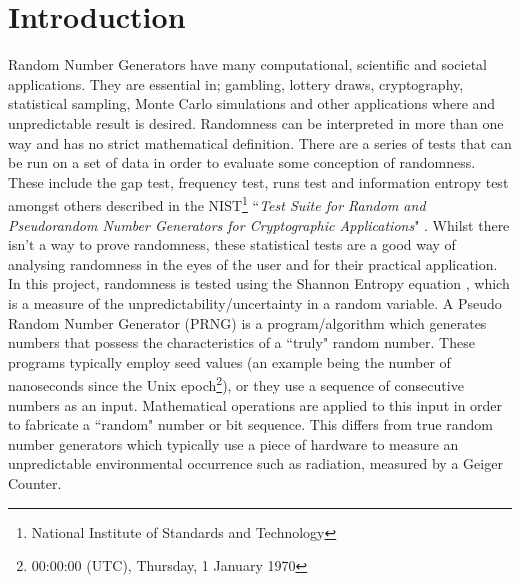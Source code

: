 \documentclass[a4paper,10.5pt]{article}
\begin{document}
\section{Introduction}
Random Number Generators have many computational, scientific and societal applications. They are essential in; gambling, lottery draws, cryptography, statistical sampling, Monte Carlo simulations and other applications where and unpredictable result is desired. Randomness can be interpreted in more than one way and has no strict mathematical definition. There are a series of tests that can be run on a set of data in order to evaluate some conception of randomness. These include the gap test, frequency test, runs test and information entropy test amongst others described in the NIST\footnote{National Institute of Standards and Technology} ``\emph{Test Suite for Random and Pseudorandom Number Generators for Cryptographic Applications}" \cite{nist}. Whilst there isn't a way to prove randomness, these statistical tests are a good way of analysing randomness in the eyes of the user and for their practical application. In this project, randomness is tested using the Shannon Entropy equation \cite[p.2]{kozarng}, which is a measure of the unpredictability/uncertainty in a random variable.
A Pseudo Random Number Generator (PRNG) is a program/algorithm which generates numbers that possess the characteristics of a ``truly" random number. These programs typically employ seed values (an example being the number of nanoseconds since the Unix epoch\footnote{00:00:00 (UTC), Thursday, 1 January 1970}), or they use a sequence of consecutive numbers as an input. Mathematical operations are applied to this input in order to fabricate a ``random" number or bit sequence. This differs from true random number generators which typically use a piece of hardware to measure an unpredictable environmental occurrence such as radiation, measured by a Geiger Counter. 
\end{document}

